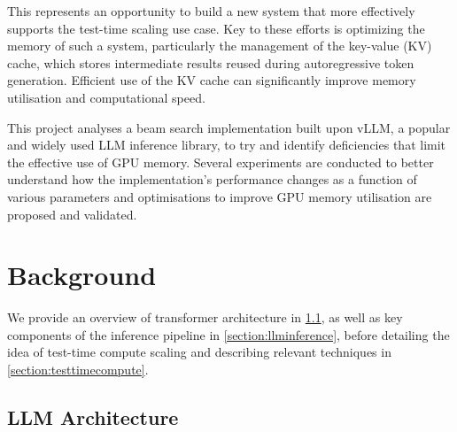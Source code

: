 \documentclass[11pt,twoside]{report}
\begin{document}
This represents an opportunity to build a new system that more effectively supports the test-time scaling use case.
Key to these efforts is optimizing the memory of such a system, particularly the management of the key-value (KV) cache, which stores intermediate results reused during autoregressive token generation. 
Efficient use of the KV cache can significantly improve memory utilisation and computational speed.

This project analyses a beam search implementation built upon vLLM, a popular and widely used LLM inference library, to try and identify deficiencies that limit the effective use of GPU memory. 
Several experiments are conducted to better understand how the implementation's performance changes as a function of various parameters and optimisations to improve GPU memory utilisation are proposed and validated. 


\chapter{Background} %
We provide an overview of transformer architecture in \ref{section:llmarchitecture}, as well as key components of the inference pipeline in \ref{section:llminference}, before detailing the idea of test-time compute scaling and describing relevant techniques in \ref{section:testtimecompute}.
\section{LLM Architecture}\label{section:llmarchitecture}
\end{document}
